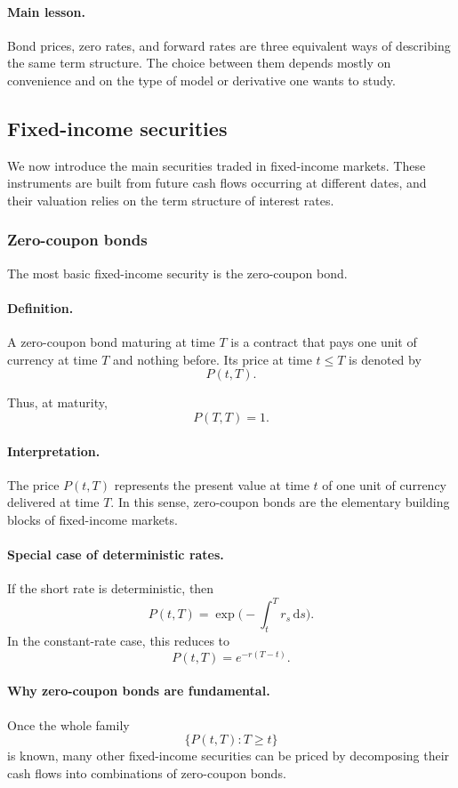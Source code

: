 \documentclass[11pt]{article}
\theoremstyle{plain}
\theoremstyle{definition}
\theoremstyle{remark}
\begin{document}
\paragraph{Main lesson.}
Bond prices, zero rates, and forward rates are three equivalent ways of
describing the same term structure.
The choice between them depends mostly on convenience and on the type of
model or derivative one wants to study.
\subsection{Fixed-income securities}

We now introduce the main securities traded in fixed-income markets.
These instruments are built from future cash flows occurring at
different dates, and their valuation relies on the term structure of
interest rates.

\subsubsection{Zero-coupon bonds}

The most basic fixed-income security is the zero-coupon bond.

\paragraph{Definition.}
A zero-coupon bond maturing at time \(T\) is a contract that pays one
unit of currency at time \(T\) and nothing before.
Its price at time \(t\le T\) is denoted by
\[
P(t,T).
\]

Thus, at maturity,
\[
P(T,T)=1.
\]

\paragraph{Interpretation.}
The price \(P(t,T)\) represents the present value at time \(t\) of one
unit of currency delivered at time \(T\).
In this sense, zero-coupon bonds are the elementary building blocks of
fixed-income markets.

\paragraph{Special case of deterministic rates.}
If the short rate is deterministic, then
\[
P(t,T)=\exp\!\Big(-\int_t^T r_s\,\mathrm{d}s\Big).
\]
In the constant-rate case, this reduces to
\[
P(t,T)=e^{-r(T-t)}.
\]

\paragraph{Why zero-coupon bonds are fundamental.}
Once the whole family
\[
\{P(t,T):T\ge t\}
\]
is known, many other fixed-income securities can be priced by
decomposing their cash flows into combinations of zero-coupon bonds.
\end{document}
